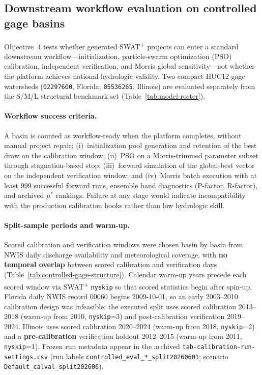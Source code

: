 \subsection{Downstream workflow evaluation on controlled gage basins}
\label{sec:methods-calibration}

Objective~4 tests whether generated SWAT\textsuperscript{+} projects can enter a standard downstream workflow---initialization, particle-swarm optimization (PSO) calibration, independent verification, and Morris global sensitivity---not whether the platform achieves national hydrologic validity.
Two compact HUC12 gage watersheds (\texttt{02297600}, Florida; \texttt{05536265}, Illinois) are evaluated separately from the S/M/L structural benchmark set (Table~\ref{tab:model-roster}).

\paragraph{Workflow success criteria.}
A basin is counted as workflow-ready when the platform completes, without manual project repair: (i)~initialization pool generation and retention of the best draw on the calibration window; (ii)~PSO on a Morris-trimmed parameter subset through stagnation-based stop; (iii)~forward simulation of the global-best vector on the independent verification window; and (iv)~Morris batch execution with at least 999 successful forward runs, ensemble band diagnostics (P-factor, R-factor), and archived $\mu^*$ rankings.
Failure at any stage would indicate incompatibility with the production calibration hooks rather than low hydrologic skill.

\paragraph{Split-sample periods and warm-up.}
Scored calibration and verification windows were chosen basin by basin from NWIS daily discharge availability and meteorological coverage, with \textbf{no temporal overlap} between scored calibration and verification days (Table~\ref{tab:controlled-gage-structure}).
Calendar warm-up years precede each scored window via SWAT\textsuperscript{+} \texttt{nyskip} so that scored statistics begin after spin-up.
Florida daily NWIS record 00060 begins 2009-10-01, so an early 2003--2010 calibration design was infeasible; the executed split uses scored calibration 2013--2018 (warm-up from 2010, \texttt{nyskip}=3) and post-calibration verification 2019--2024.
Illinois uses scored calibration 2020--2024 (warm-up from 2018, \texttt{nyskip}=2) and a \textbf{pre-calibration} verification holdout 2012--2015 (warm-up from 2011, \texttt{nyskip}=1).
Frozen run metadata appear in the archived \texttt{tab-calibration-run-settings.csv} (run labels \texttt{controlled\_eval\_*\_split20260601}; scenario \texttt{Default\_calval\_split202606}).


